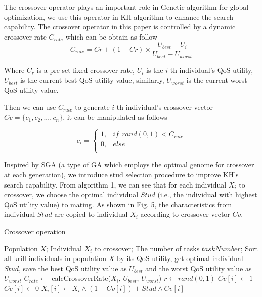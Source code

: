 \documentclass[10pt,journal,compsoc]{IEEEtran}
\begin{document}
The crossover operator plays an important role in Genetic algorithm for global optimization, we use this operator in KH algorithm to enhance the search capability. The crossover operator in this paper is controlled by a dynamic crossover rate $C_{rate}$ which can be obtain as follow
\begin{equation}
C_{rate} = Cr + (1-Cr) \times \frac{U_{best}-U_{i}}{U_{best}-U_{worst}}
\end{equation}

Where $C_r$ is a pre-set fixed crossover rate, $U_{i}$ is the $i$-th individual's QoS utility, $U_{best}$ is the current best QoS utility value, similarly, $U_{worst}$ is the current worst QoS utility value. 

Then we can use $C_{rate}$ to generate $i$-th individual's crossover vector $Cv = \{c_{1},c_{2},...,c_{n}\}$, it can be manipulated as follows

\begin{equation}
c_{i}=
\begin{cases}
1,& if \ \ rand(0,1) < C_{rate}\\
0,& else\\
\end{cases}
\end{equation}

Inspired by SGA \cite{khatib1998stud} (a type of GA which employs the optimal genome for crossover at each generation), we introduce stud selection procedure to improve KH's search capability.
From algorithm 1, we can see that for each individual $X_i$ to crossover, we choose the optimal individual $Stud$ (i.e., the individual with highest QoS utility value) to mating. As shown in Fig. 5, the characteristics from individual $Stud$ are copied to individual $X_i$ according to crossover vector $Cv$. 

\begin{algorithm}
\caption{Crossover operation}
\label{alg1}
\begin{algorithmic}[1]

\REQUIRE Population $X$; Individual $X_i$ to crossover; The number of tasks $taskNumber$; 
\STATE Sort all krill individuals in population $X$ by its QoS utility, get optimal individual $Stud$, save the best QoS utility value as $U_{best}$ and the worst QoS utility value as $U_{worst}$
\STATE $C_{rate} \leftarrow$ calcCrossoverRate($X_i$, $U_{best}$, $U_{worst}$)
\STATE $r \leftarrow rand(0,1)$
\STATE $Cv[i] \leftarrow 1$
\ELSE
\STATE $Cv[i] \leftarrow 0$
\ENDIF
\ENDFOR
{}
\STATE $X_i[i] \leftarrow X_i \wedge  (1-Cv[i]) + Stud \wedge Cv[i]$ 
\ENDFOR
\end{algorithmic}
\end{algorithm}
\end{document}
